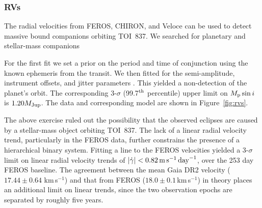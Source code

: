 \documentclass[12pt,twocolumn,tighten]{aastex63}
\newcommand{\tn}{TOI~837} %
\newcommand{\kms}{\,km\,s$^{-1}$}
\begin{document}
\subsubsection{RVs}
The radial velocities from FEROS, CHIRON, and Veloce can be used to
detect massive bound companions orbiting \tn.  We searched for
planetary and stellar-mass companions

For the first fit we set a prior on the period and time of conjunction
using the known ephemeris from the transit.  We then fitted for the
semi-amplitude, instrument offsets, and jitter parameters .  This yielded a non-detection of the planet's orbit.  The
corresponding 3-$\sigma$ (99.7$^{\rm th}$ percentile) upper limit on
$M_{\rm p} \sin i$ is $1.20 M_{\rm Jup}$.  The data and corresponding
model are shown in Figure~\ref{fig:rvs}.

The above exercise ruled out the possibility that the observed
eclipses are caused by a stellar-mass object orbiting \tn.  The lack
of a linear radial velocity trend, particularly in the FEROS data,
further constrains the presence of a hierarchical binary system.
Fitting a line to the FEROS velocities yielded a 3-$\sigma$ limit on
linear radial velocity trends of $|\dot{\gamma}| < 0.82\,{\rm
m\,s}^{-1}\,{\rm day}^{-1}$, over the 253 day FEROS baseline.  The
agreement between the mean Gaia DR2 velocity ($17.44 \pm 0.64\,$\kms)
and that from FEROS ($18.0 \pm 0.1$\kms) in theory places an
additional limit on linear trends, since the two observation epochs
are separated by roughly five years.
\end{document}
